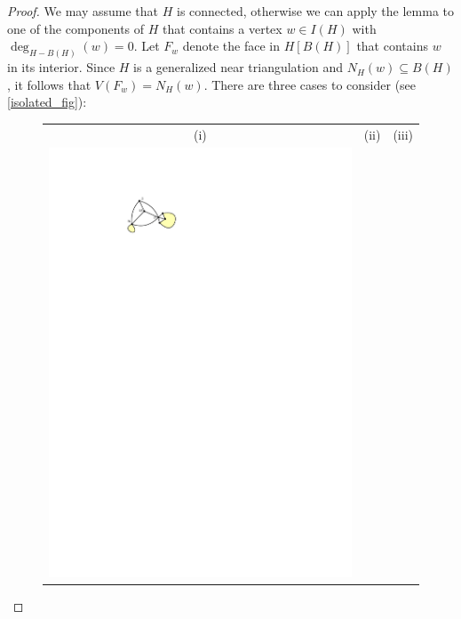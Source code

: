 \documentclass{article}
\newcommand{\pat}[1]{\textcolor{red}{PM: #1}}
\newcommand{\hussein}[1]{\textcolor{purple}{HH: #1}}
\theoremstyle{definition}
\begin{document}
\begin{proof}
  We may assume that $H$ is connected, otherwise we can apply the lemma to one of the components of $H$ that contains a vertex $w\in I(H)$ with $\deg_{H-B(H)}(w)=0$. Let $F_w$ denote the face in $H[B(H)]$ that contains $w$ in its interior.  Since $H$ is a generalized near triangulation and $N_H(w)\subseteq B(H)$, it follows that $V(F_w)=N_H(w)$.
  There are three cases to consider (see \cref{isolated_fig}):
  \begin{figure}%
    \centering
    \begin{tabular}{ccc}
      (i) & (ii) & (iii)\\
      \includegraphics[page=1]{figs/degree_zero_killer} &

\end{tabular}
\end{figure}
\end{proof}
\end{document}
